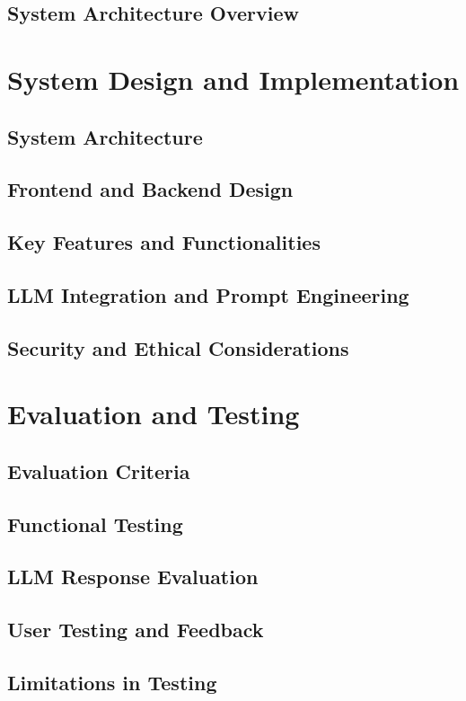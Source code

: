 \documentclass{report}
\begin{document}
\section{System Architecture Overview}

\chapter{System Design and Implementation}  %
\section{System Architecture}
\section{Frontend and Backend Design}
\section{Key Features and Functionalities}
\section{LLM Integration and Prompt Engineering}
\section{Security and Ethical Considerations}

\chapter{Evaluation and Testing}  %
\section{Evaluation Criteria}
\section{Functional Testing}
\section{LLM Response Evaluation}
\section{User Testing and Feedback}
\section{Limitations in Testing}
\end{document}
